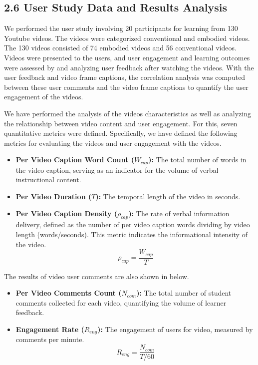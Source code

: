 \documentclass[12pt]{article}
\begin{document}
\subsection*{2.6 User Study Data and Results Analysis}

We performed the user study involving 20 participants for learning from 130 Youtube videos. The videos were categorized conventional and embodied videos. The 130 videos consisted of 74 embodied videos
and 56 conventional videos. Videos were presented to the users, and user engagement and learning outcomes were assessed by and analyzing user feedback after watching the videos. With the user feedback and video frame captions, the correlation analysis was computed between these user comments and the video frame captions to quantify the user engagement of the videos.


We have performed the analysis of the videos characteristics as well as analyzing the relationship between video content and user engagement. For this, seven quantitative metrics were defined. Specifically, we have defined the following metrics for evaluating the videos and user engagement with the videos.   

\begin{itemize}

    \item \textbf{Per Video Caption Word Count ($W_{cap}$):} The total number of words in the video caption, serving as an indicator for the volume of verbal instructional content.

    \item \textbf{Per Video Duration ($T$):} The temporal length of the video in seconds.

    \item \textbf{Per Video Caption Density ($\rho_{cap}$):} The rate of verbal information delivery, defined as the number of per video caption words dividing by video length (words/seconds). This metric indicates the informational intensity of the video.
    \begin{equation}
        \rho_{cap} = \frac{W_{cap}}{T}
    \end{equation}
    
\end{itemize}

The results of video user comments are also shown in below.

\begin{itemize}

    \item \textbf{Per Video Comments Count ($N_{com}$):} The total number of student comments collected for each video, quantifying the volume of learner feedback.


    \item \textbf{Engagement Rate ($R_{eng}$):} The engagement of users for video, measured by comments per minute.
    \begin{equation}
        R_{eng} = \frac{N_{com}}{T/60}
    \end{equation}
    
\end{itemize}
\end{document}
